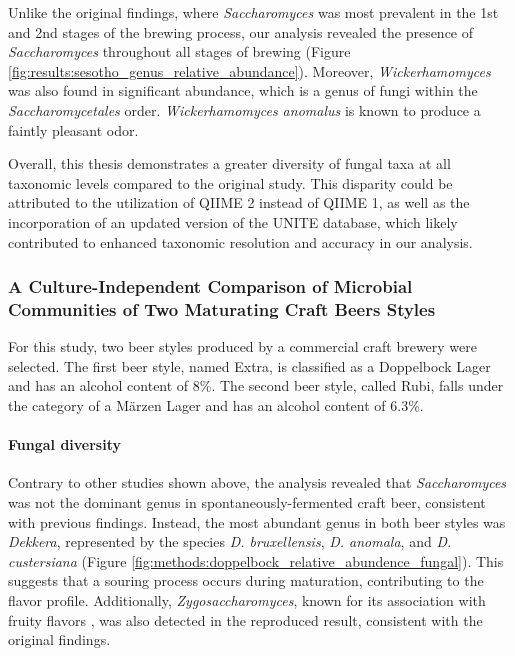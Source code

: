     Unlike the original findings, where \textit{Saccharomyces} was most prevalent in the 1st and 2nd stages of the brewing process, our analysis revealed the presence of \textit{Saccharomyces} throughout all stages of brewing (Figure \ref{fig:results:sesotho_genus_relative_abundance}). Moreover, \textit{Wickerhamomyces} was also found in significant abundance, which is a genus of fungi within the \textit{Saccharomycetales} order. \textit{Wickerhamomyces anomalus} is known to produce a faintly pleasant odor.

    Overall, this thesis demonstrates a greater diversity of fungal taxa at all taxonomic levels compared to the original study. This disparity could be attributed to the utilization of QIIME 2 instead of QIIME 1, as well as the incorporation of an updated version of the UNITE database, which likely contributed to enhanced taxonomic resolution and accuracy in our analysis.
    
\subsubsection{A Culture-Independent Comparison of Microbial Communities of Two Maturating Craft Beers Styles}

    For this study, two beer styles produced by a commercial craft brewery were selected. The first beer style, named Extra, is classified as a Doppelbock Lager and has an alcohol content of 8\%. The second beer style, called Rubi, falls under the category of a Märzen Lager and has an alcohol content of 6.3\%.

    \paragraph*{Fungal diversity}
    Contrary to other studies shown above, the analysis revealed that \textit{Saccharomyces} was not the dominant genus in spontaneously-fermented craft beer, consistent with previous findings\cite{shayevitz2020barrel}. Instead, the most abundant genus in both beer styles was \textit{Dekkera}, represented by the species \textit{D. bruxellensis}, \textit{D. anomala}, and \textit{D. custersiana} (Figure \ref{fig:methods:doppelbock_relative_abundence_fungal}). This suggests that a souring process occurs during maturation, contributing to the flavor profile. Additionally, \textit{Zygosaccharomyces}, known for its association with fruity flavors \cite{methner2019screening}, was also detected in the reproduced result, consistent with the original findings.
    
